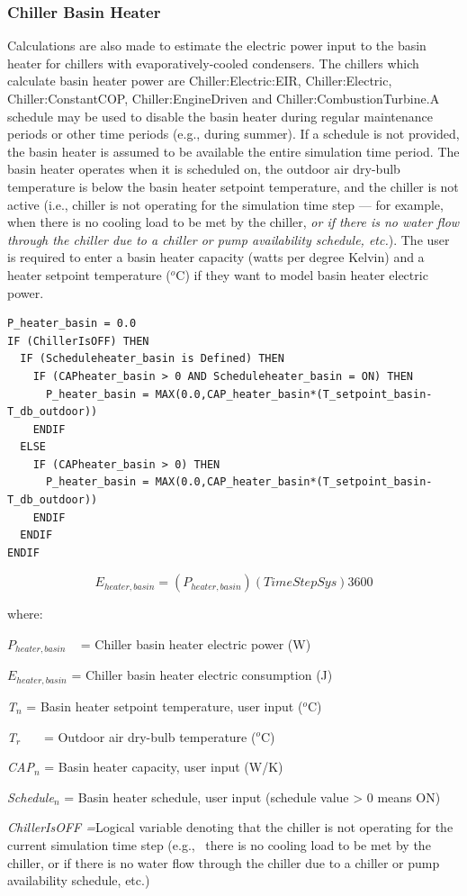 \subsubsection{Chiller Basin Heater}\label{chiller-basin-heater-3}

Calculations are also made to estimate the electric power input to the basin heater for chillers with evaporatively-cooled condensers. The chillers which calculate basin heater power are Chiller:Electric:EIR, Chiller:Electric, Chiller:ConstantCOP, Chiller:EngineDriven and Chiller:CombustionTurbine.A schedule may be used to disable the basin heater during regular maintenance periods or other time periods (e.g., during summer). If a schedule is not provided, the basin heater is assumed to be available the entire simulation time period. The basin heater operates when it is scheduled on, the outdoor air dry-bulb temperature is below the basin heater setpoint temperature, and the chiller is not active (i.e., chiller is not operating for the simulation time step --- for example, when there is no cooling load to be met by the chiller, \emph{or if there is no water flow through the chiller due to a chiller or pump availability schedule, etc.}). The user is required to enter a basin heater capacity (watts per degree Kelvin) and a heater setpoint temperature (\(^{o}\)C) if they want to model basin heater electric power.

\begin{lstlisting}
P_heater_basin = 0.0
IF (ChillerIsOFF) THEN
  IF (Scheduleheater_basin is Defined) THEN
    IF (CAPheater_basin > 0 AND Scheduleheater_basin = ON) THEN
      P_heater_basin = MAX(0.0,CAP_heater_basin*(T_setpoint_basin-T_db_outdoor))
    ENDIF
  ELSE
    IF (CAPheater_basin > 0) THEN
      P_heater_basin = MAX(0.0,CAP_heater_basin*(T_setpoint_basin-T_db_outdoor))
    ENDIF
  ENDIF
ENDIF
\end{lstlisting}

\begin{equation}
{E_{heater,basin}} = \left( {{P_{heater,basin}}} \right)\left( {TimeStepSys} \right)3600
\end{equation}

where:

\({P_{heater,basin}}\) ~ = Chiller basin heater electric power (W)

\({E_{heater,basin}}\) = Chiller basin heater electric consumption (J)

\emph{T\(_{n}\)} = Basin heater setpoint temperature, user input (\(^{o}\)C)

\emph{T\(_{r}\)}~~~ = Outdoor air dry-bulb temperature (\(^{o}\)C)

\emph{CAP\(_{n}\)} = Basin heater capacity, user input (W/K)

\emph{Schedule\(_{n}\)} = Basin heater schedule, user input (schedule value \textgreater{} 0 means ON)

\emph{ChillerIsOFF =}Logical variable denoting that the chiller is not operating for the current simulation time step (e.g.,~ there is no cooling load to be met by the chiller, or if there is no water flow through the chiller due to a chiller or pump availability schedule, etc.) 
